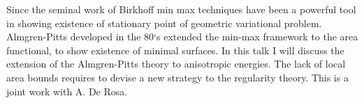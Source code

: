 \mypage
{}
\begin{myabstract}
Since the seminal work of Birkhoff min max techniques have been a powerful tool in showing existence of stationary point of geometric variational problem. Almgren-Pitts developed in the 80`s extended the min-max framework to the area functional, to show existence of minimal surfaces. In this talk I will discuss the extension of the Almgren-Pitts theory to anisotropic energies. The lack of local area bounds requires to devise a new strategy to the regularity theory. This is a joint work with A. De Rosa.
\end{myabstract}            
